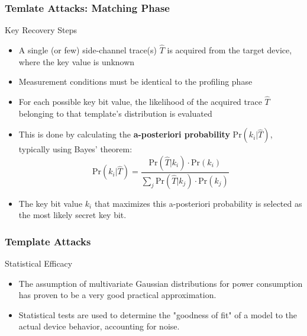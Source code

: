 \begin{frame}
    \frametitle{Temlate Attacks: Matching Phase}
    \begin{block}{Key Recovery Steps}
        \begin{itemize}
            \item A single (or few) side-channel trace(s) $\hat{T}$ is acquired from the target device, where the key value is unknown
            \item Measurement conditions must be identical to the profiling phase
            \item For each possible key bit value, the likelihood of the acquired trace $\hat{T}$ belonging to that template's distribution is evaluated
            \item This is done by calculating the \textbf{a-posteriori probability} $\text{Pr}(k_i | \hat{T})$, typically using Bayes' theorem:
            $$
            \text{Pr}(k_i | \hat{T}) = \frac{\text{Pr}(\hat{T} | k_i) \cdot \text{Pr}(k_i)}{\sum_j \text{Pr}(\hat{T} | k_j) \cdot \text{Pr}(k_j)}
            $$
            \item The key bit value $k_i$ that maximizes this a-posteriori probability is selected as the most likely secret key bit.
        \end{itemize}
    \end{block}
\end{frame}
\begin{frame}
\frametitle{Template Attacks}
    \begin{block}{Statistical Efficacy}
        \begin{itemize}
            \item The assumption of multivariate Gaussian distributions for power consumption has proven to be a very good practical approximation.
            \item Statistical tests are used to determine the "goodness of fit" of a model to the actual device behavior, accounting for noise.
        \end{itemize}
    \end{block}
\end{frame}
